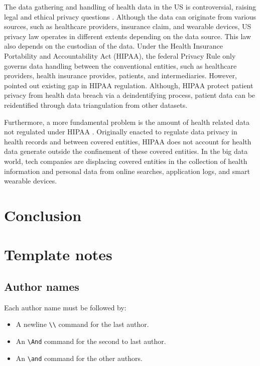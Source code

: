 \documentclass{article}
\begin{document}
The data gathering and handling of health data in the US is controversial, raising legal and ethical privacy questions \cite{price_privacy_2019}.
Although the data can originate from various sources, such as healthcare providers, insurance claim, and wearable devices, US privacy law operates in different extents depending on the data source.
This law also depends on the custodian of the data. Under the Health Insurance Portability and Accountability Act (HIPAA), the federal Privacy Rule only governs data handling between the conventional entities, such as healthcare providers, health insurance provides, patients, and intermediaries. 
However, \cite{price_privacy_2019} pointed out existing gap in HIPAA regulation.
Although, HIPAA protect patient privacy from health data breach via a deindentifying process, patient data can be reidentified through data triangulation from other datasets.


Furthermore, a more fundamental problem is the amount of health related data not regulated under HIPAA \cite{price_privacy_2019}. 
Originally enacted to regulate data privacy in health records and between covered entities, HIPAA does not account for health data generate outside the confinement of these covered entities. 
In the big data world, tech companies are displacing covered entities in the collection of health information and personal data from online searches, application logs, and smart wearable devices.

\section{Conclusion}

\section{Template notes}

\subsection{Author names}

Each author name must be followed by:
\begin{itemize}
    \item A newline {\tt \textbackslash{}\textbackslash{}} command for the last author.
    \item An {\tt \textbackslash{}And} command for the second to last author.
    \item An {\tt \textbackslash{}and} command for the other authors.
\end{itemize}
\end{document}
